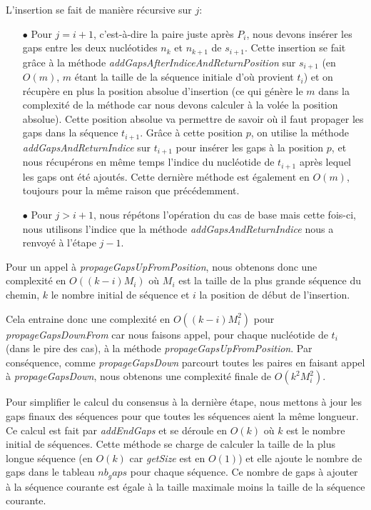 L'insertion se fait de manière récursive sur $j$:
\begin{itemize}
	\item[$\bullet$] Pour $j = i + 1$, c'est-à-dire la paire juste après $P_{i}$, nous
		devons insérer les gaps entre les deux nucléotides $n_{k}$ et $n_{k +
		1}$ de $s_{i + 1}$. Cette insertion se fait grâce à la méthode
		\emph{addGapsAfterIndiceAndReturnPosition} sur $s_{i + 1}$ (en $O(m)$,
		$m$ étant la taille de la séquence initiale d'où provient $t_{i}$) et on
		récupère en plus la position absolue d'insertion (ce qui génère le $m$
		dans la complexité de la méthode car nous devons calculer à la volée la
		position absolue). Cette position absolue va permettre de savoir où il
		faut propager les gaps dans la séquence $t_{i + 1}$. Grâce à cette
		position $p$, on utilise la méthode \emph{addGapsAndReturnIndice} sur $t_{i
		+ 1}$ pour insérer les gaps à la position $p$, et nous récupérons en
		même temps l'indice du nucléotide de $t_{i + 1}$ après lequel les gaps
		ont été ajoutés. Cette dernière méthode est également en $O(m)$,
		toujours pour la même raison que précédemment.
	\item[$\bullet$] Pour $j > i + 1$, nous répétons l'opération du cas de base mais cette
		fois-ci, nous utilisons l'indice que la méthode
		\emph{addGapsAndReturnIndice} nous a renvoyé à l'étape $j - 1$.
\end{itemize}

Pour un appel à \emph{propageGapsUpFromPosition}, nous obtenons donc une
complexité en $O( (k - i) M_{i})$ où $M_{i}$ est la taille de la plus grande
séquence du chemin, $k$ le nombre initial de séquence et $i$ la position de
début de l'insertion.

Cela entraine donc une complexité en $O( (k - i) M_{i}^{2})$ pour
\emph{propageGapsDownFrom} car nous faisons appel, pour chaque nucléotide de
$t_{i}$ (dans le pire des cas), à la méthode \-\emph{propageGapsUpFromPosition}.
Par conséquence, comme \emph{propageGapsDown} parcourt toutes les paires en
faisant appel à \emph{propageGapsDown}, nous obtenons une complexité finale de
$O(k^{2} M_{i}^{2})$.

Pour simplifier le calcul du consensus à la dernière étape, nous mettons à jour
les gaps finaux des séquences pour que toutes les séquences aient la même
longueur. Ce calcul est fait par \emph{addEndGaps} et se déroule en $O(k)$ où
$k$ est le nombre initial de séquences. Cette méthode se charge de calculer la
taille de la plus longue séquence (en $O(k)$ car \emph{getSize} est en $O(1)$)
et elle ajoute le nombre de gaps dans le tableau \emph{$nb_gaps$} pour chaque
séquence. Ce nombre de gaps à ajouter à la séquence courante est égale à la
taille maximale moins la taille de la séquence courante.

